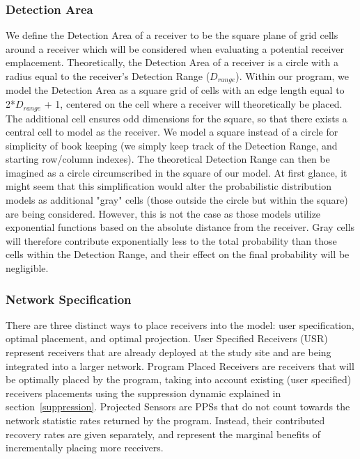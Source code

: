 \subsubsection{Detection Area}
We define the Detection Area of a receiver to be the square plane of grid cells around a receiver which will be considered when evaluating a potential receiver emplacement.  Theoretically, the Detection Area of a receiver is a circle with a radius equal to the receiver's Detection Range ($D_{range}$).  Within our program, we model the Detection Area as a square grid of cells with an edge length equal to 2*$D_{range}$ + 1, centered on the cell where a receiver will theoretically be placed.  The additional cell ensures odd dimensions for the square, so that there exists a central cell to model as the receiver.  We model a square instead of a circle for simplicity of book keeping (we simply keep track of the Detection Range, and starting row/column indexes).  The theoretical Detection Range can then be imagined as a circle circumscribed in the square of our model.  At first glance, it might seem that this simplification would alter the probabilistic distribution models as additional "gray" cells (those outside the circle but within the square) are being considered.  However, this is not the case as those models utilize exponential functions based on the absolute distance from the receiver.  Gray cells will therefore contribute exponentially less to the total probability than those cells within the Detection Range, and their effect on the final probability will be negligible.  

\subsubsection{Network Specification}
There are three distinct ways to place receivers into the model: user specification, optimal placement, and optimal projection.  User Specified Receivers (USR) represent receivers that are already deployed at the study site and are being integrated into a larger network.    Program Placed Receivers are receivers that will be  optimally placed by the program, taking into account existing (user specified) receivers placements using the suppression dynamic explained in section~\ref{suppression}.  Projected Sensors are PPSs that do not count towards the network statistic rates returned by the program.  Instead, their contributed recovery rates are given separately, and represent the marginal benefits of incrementally placing more receivers.  


